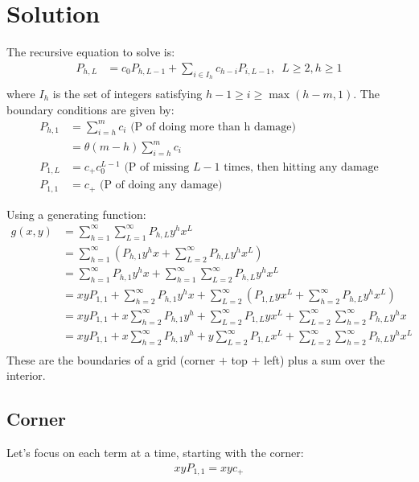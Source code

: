 \section{Solution}
	The recursive equation to solve is:
	\begin{align}
		P_{h, L} &= c_0P_{h, L - 1} + \sum_{i\in I_h} c_{h-i} P_{i, L-1},\,\,\, L \ge 2, h \ge 1\\ %
	\end{align}
	where $I_h$ is the set of integers satisfying $h - 1 \ge i \ge \max(h - m, 1)$. The boundary conditions are given by:
	\begin{align}
		P_{h, 1} &= \sum_{i=h}^m c_i \text{ (P of doing more than h damage)} \\
		 &= \theta(m - h) \sum_{i=h}^m c_i \\
		P_{1, L} &= c_+ c_0^{L-1} \text{ (P of missing $L-1$ times, then hitting any damage}\\
		P_{1, 1} &= c_+ \text{ (P of doing any damage)}
	\end{align}
	
	Using a generating function:
	\begin{align}
		g(x, y) &= \sum_{h=1}^\infty\sum_{L=1}^\infty P_{h, L} y^h x^L \\
		&= \sum_{h=1}^\infty\left(P_{h, 1} y^h x + \sum_{L=2}^\infty P_{h, L} y^h x^L \right)\\
		&= \sum_{h=1}^\infty P_{h, 1} y^h x + \sum_{h=1}^\infty\sum_{L=2}^\infty P_{h, L} y^h x^L\\
		&= xyP_{1, 1} + \sum_{h=2}^\infty P_{h, 1} y^h x + \sum_{L=2}^\infty\left( P_{1,L} yx^L + \sum_{h=2}^\infty P_{h, L} y^h x^L \right)\\
		&= xyP_{1, 1}  + x\sum_{h=2}^\infty P_{h, 1} y^h + \sum_{L=2}^\infty P_{1,L} yx^L + \sum_{L=2}^\infty\sum_{h=2}^\infty P_{h, L} y^h x \\
		&= xyP_{1, 1}  + x\sum_{h=2}^\infty P_{h, 1} y^h  + y\sum_{L=2}^\infty P_{1,L} x^L + \sum_{L=2}^\infty\sum_{h=2}^\infty P_{h, L} y^hx^L \\
	\end{align}
	These are the boundaries of a grid (corner $+$ top $+$ left) plus a sum over the interior. 

	\subsection{Corner} 
	Let's focus on each term at a time, starting with the corner:
	\begin{align}
		xyP_{1, 1} = xyc_+
	\end{align}
